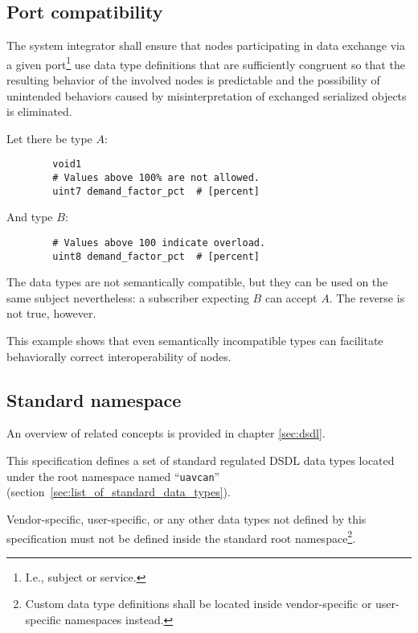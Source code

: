\subsection{Port compatibility}


The system integrator shall ensure that nodes participating in data exchange via a given port\footnote{%
    I.e., subject or service.
} use data type definitions that are sufficiently congruent so that the resulting behavior of the involved nodes
is predictable and the possibility of unintended behaviors caused by misinterpretation of exchanged serialized
objects is eliminated.

\begin{remark}
    Let there be type $A$:

    \begin{verbatim}
        void1
        # Values above 100% are not allowed.
        uint7 demand_factor_pct  # [percent]
    \end{verbatim}

    And type $B$:

    \begin{verbatim}
        # Values above 100 indicate overload.
        uint8 demand_factor_pct  # [percent]
    \end{verbatim}

    The data types are not semantically compatible, but they can be used on the same subject nevertheless:
    a subscriber expecting $B$ can accept $A$.
    The reverse is not true, however.

    This example shows that even semantically incompatible types can facilitate
    behaviorally correct interoperability of nodes.
\end{remark}

\subsection{Standard namespace}

An overview of related concepts is provided in chapter \ref{sec:dsdl}.

This specification defines a set of standard regulated DSDL data types located under
the root namespace named ``\verb"uavcan"'' (section~\ref{sec:list_of_standard_data_types}).

Vendor-specific, user-specific, or any other data types not defined by this specification
must not be defined inside the standard root namespace\footnote{Custom data type definitions shall be located
inside vendor-specific or user-specific namespaces instead.}.

